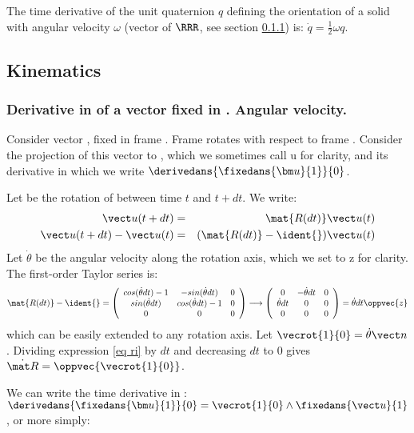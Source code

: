 The time derivative of the unit quaternion $q$ defining the orientation of a solid with angular velocity $\omega$ (vector of $\RRR$, see section \ref{sec:omega}) is: $\dot q = \frac{1}{2}\omega q$.


\subsection{Kinematics}
\subsubsection{Derivative in  of a vector fixed in . Angular velocity.} \label{sec:omega}
Consider vector , fixed in frame . Frame  rotates with respect to frame . Consider the projection  of this vector to , which we sometimes call \vect u for clarity, and its derivative in  which we write $\derivedans{\fixedans{\bm u}{1}}{0}$.


Let  be the rotation of  between time $t$ and $t+dt$. We write:
\begin{eqnarray}
 \vect u(t+dt) &=& \mat{R(dt)} \vect u(t)\\
 \vect u(t+dt) - \vect u(t)&=& (\mat{R(dt)}-\ident{}) \vect u(t) \label{eq ri}
\end{eqnarray}
Let $\dot{\theta}$ be the angular velocity along the rotation axis, which we set to \vect z for clarity. The first-order Taylor series is: 
$$
 \mat{R(dt)}-\ident{} = 
 \left(\begin{array}{ccc}
  cos(\dot{\theta}dt)-1 & -sin(\dot{\theta}dt) & 0\\   
   sin(\dot{\theta}dt)& cos(\dot{\theta}dt)-1& 0\\ 
  0 & 0 & 0 
 \end{array}\right)
 \longrightarrow
 \left(\begin{array}{ccc}
  0 & -\dot{\theta}dt & 0\\
  \dot{\theta}dt & 0 & 0\\
  0 & 0 & 0
 \end{array}\right) 
 =
 \dot{\theta}dt \oppvec{z}
$$
which can be easily extended to any rotation axis. Let $\vecrot{1}{0}=\dot{\theta}\vect n$. Dividing expression \ref{eq ri} by $dt$ and decreasing $dt$ to $0$ gives $\dot{\mat R} = \oppvec{ \vecrot{1}{0} }$.

We can write the time derivative in : $\derivedans{\fixedans{\bm u}{1}}{0}  = \vecrot{1}{0} \wedge  \fixedans{\vect u}{1}$, or more simply:

